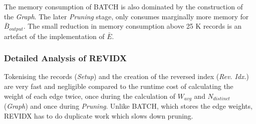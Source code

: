 \documentclass[a4paper,12pt]{article}
\begin{document}
\begin{center}
\end{center}

The memory consumption of BATCH is also dominated by the construction of the \emph{Graph}. The later \emph{Pruning} stage, only consumes marginally more memory for $\bar B_{output}$. The small reduction in memory consumption above 25 K records is an artefact of the implementation of $\bar E$. \\

\begin{center}
\end{center}

\newpage
\subsubsection{Detailed Analysis of REVIDX}
Tokenising the records (\emph{Setup}) and the creation of the reversed index (\emph{Rev. Idx.}) are very fast and negligible compared to the runtime cost of calculating the weight of each edge twice, once during the calculation of $W_{avg}$ and $N_{distinct}$ (\emph{Graph}) and once during \emph{Pruning}. Unlike BATCH, which stores the edge weights, REVIDX has to do duplicate work which slows down pruning. \\
\end{document}
